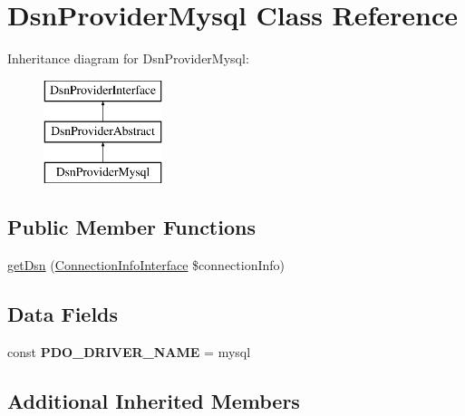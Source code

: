 \hypertarget{class_pes_1_1_database_1_1_handler_1_1_dsn_provider_1_1_dsn_provider_mysql}{}\section{Dsn\+Provider\+Mysql Class Reference}
\label{class_pes_1_1_database_1_1_handler_1_1_dsn_provider_1_1_dsn_provider_mysql}
Inheritance diagram for Dsn\+Provider\+Mysql\+:\begin{figure}[H]
\begin{center}
\leavevmode
\includegraphics[height=3.000000cm]{class_pes_1_1_database_1_1_handler_1_1_dsn_provider_1_1_dsn_provider_mysql}
\end{center}
\end{figure}
\subsection*{Public Member Functions}
\begin{DoxyCompactItemize}
\item 
\mbox{\hyperlink{class_pes_1_1_database_1_1_handler_1_1_dsn_provider_1_1_dsn_provider_mysql_a7252e2f23ea50a5061fef81d06d6765a}{get\+Dsn}} (\mbox{\hyperlink{interface_pes_1_1_database_1_1_handler_1_1_connection_info_interface}{Connection\+Info\+Interface}} \$connection\+Info)
\end{DoxyCompactItemize}
\subsection*{Data Fields}
\begin{DoxyCompactItemize}
\item 
\mbox{\label{class_pes_1_1_database_1_1_handler_1_1_dsn_provider_1_1_dsn_provider_mysql_a0227fdc89c3004d9beb98a9894a3c0ec}} 
const {\bfseries P\+D\+O\+\_\+\+D\+R\+I\+V\+E\+R\+\_\+\+N\+A\+ME} = \textquotesingle{}mysql\textquotesingle{}
\end{DoxyCompactItemize}
\subsection*{Additional Inherited Members}


